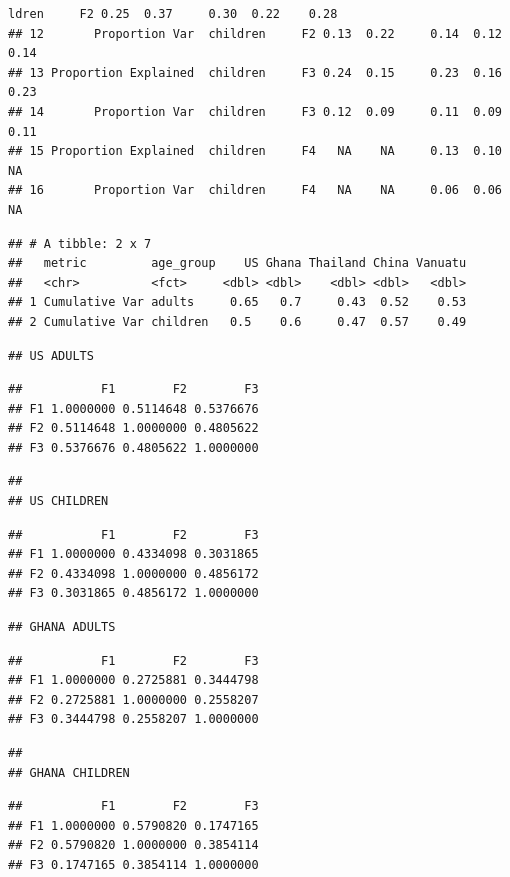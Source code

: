 \documentclass[
  man]{apa6}
\begin{document}
\begin{verbatim}
ldren     F2 0.25  0.37     0.30  0.22    0.28
## 12       Proportion Var  children     F2 0.13  0.22     0.14  0.12    0.14
## 13 Proportion Explained  children     F3 0.24  0.15     0.23  0.16    0.23
## 14       Proportion Var  children     F3 0.12  0.09     0.11  0.09    0.11
## 15 Proportion Explained  children     F4   NA    NA     0.13  0.10      NA
## 16       Proportion Var  children     F4   NA    NA     0.06  0.06      NA
\end{verbatim}

\begin{verbatim}
## # A tibble: 2 x 7
##   metric         age_group    US Ghana Thailand China Vanuatu
##   <chr>          <fct>     <dbl> <dbl>    <dbl> <dbl>   <dbl>
## 1 Cumulative Var adults     0.65   0.7     0.43  0.52    0.53
## 2 Cumulative Var children   0.5    0.6     0.47  0.57    0.49
\end{verbatim}

\begin{verbatim}
## US ADULTS
\end{verbatim}

\begin{verbatim}
##           F1        F2        F3
## F1 1.0000000 0.5114648 0.5376676
## F2 0.5114648 1.0000000 0.4805622
## F3 0.5376676 0.4805622 1.0000000
\end{verbatim}

\begin{verbatim}
## 
## US CHILDREN
\end{verbatim}

\begin{verbatim}
##           F1        F2        F3
## F1 1.0000000 0.4334098 0.3031865
## F2 0.4334098 1.0000000 0.4856172
## F3 0.3031865 0.4856172 1.0000000
\end{verbatim}

\begin{verbatim}
## GHANA ADULTS
\end{verbatim}

\begin{verbatim}
##           F1        F2        F3
## F1 1.0000000 0.2725881 0.3444798
## F2 0.2725881 1.0000000 0.2558207
## F3 0.3444798 0.2558207 1.0000000
\end{verbatim}

\begin{verbatim}
## 
## GHANA CHILDREN
\end{verbatim}

\begin{verbatim}
##           F1        F2        F3
## F1 1.0000000 0.5790820 0.1747165
## F2 0.5790820 1.0000000 0.3854114
## F3 0.1747165 0.3854114 1.0000000
\end{verbatim}
\end{document}
